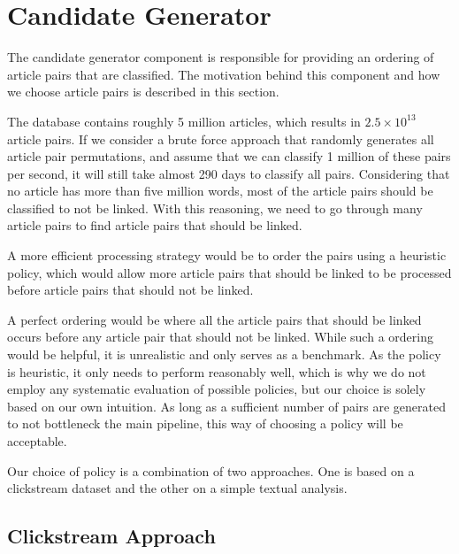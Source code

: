 \section{Candidate Generator}
The candidate generator component is responsible for providing an ordering of article pairs that are classified. The motivation behind this component and how we choose article pairs is described in this section.

The database contains roughly 5 million articles, which results in $2.5 \times 10^{13}$ article pairs. If we consider a brute force approach that randomly generates all article pair permutations, and assume that we can classify 1 million of these pairs per second, it will still take almost 290 days to classify all pairs. Considering that no article has more than five million words, most of the article pairs should be classified to not be linked. With this reasoning, we need to go through many article pairs to find article pairs that should be linked. 

A more efficient processing strategy would be to order the pairs using a heuristic policy, which would allow more article pairs that should be linked to be processed before article pairs that should not be linked. 

A perfect ordering would be where all the article pairs that should be linked occurs before any article pair that should not be linked. While such a ordering would be helpful, it is unrealistic and only serves as a benchmark. As the policy is heuristic, it only needs to perform reasonably well, which is why we do not employ any systematic evaluation of possible policies, but our choice is solely based on our own intuition. As long as a sufficient number of pairs are generated to not bottleneck the main pipeline, this way of choosing a policy will be acceptable.

Our choice of policy is a combination of two approaches. One is based on a clickstream dataset and the other on a simple textual analysis.

\subsection{Clickstream Approach}

